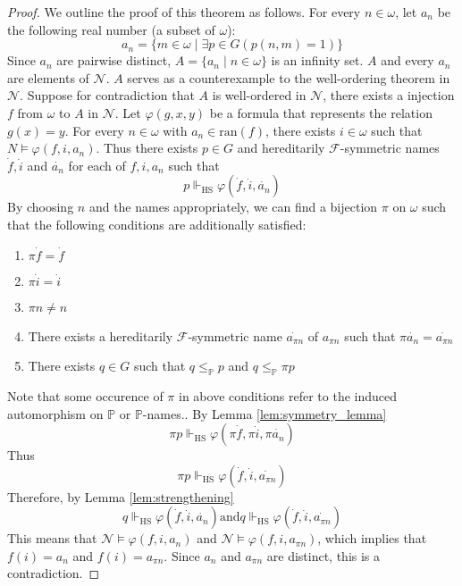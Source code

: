 \documentclass{report}
\newcommand{\Pbb}{\mathbb{P}}
\newcommand{\Fcal}{\mathcal{F}}
\newcommand{\Ncal}{\mathcal{N}}
\begin{document}
\begin{proof}
We outline the proof of this theorem as follows. 
For every $n \in \omega$, let $a_n$ be the following real number (a subset of $\omega$):
$$a_n = \{ m \in \omega \mid \exists p \in G (p(n, m) = 1) \}$$
Since $a_n$ are pairwise distinct, $A = \{ a_n \mid n \in \omega \}$ is an infinity set.
$A$ and every $a_n$ are elements of $\Ncal$.
$A$ serves as a counterexample to the well-ordering theorem in $\Ncal$.
Suppose for contradiction that $A$ is well-ordered in $\Ncal$, there exists a injection $f$ from $\omega$ to $A$ in $\Ncal$.
Let $\varphi(g,x,y)$ be a formula that represents the relation $g(x) = y$. 
For every $n \in \omega$ with $a_n \in \mathrm{ran}(f)$, there exists $i \in \omega$ such that $N \vDash \varphi(f, i, a_n)$.
Thus there exists $p \in G$ and hereditarily $\Fcal$-symmetric names $\dot{f}, \dot{i}$ and $\dot{a_n}$ for each of $f, i, a_n$ such that 
$$p \Vdash_{\mathrm{HS}} \varphi(\dot{f}, \dot{i}, \dot{a_n})$$
By choosing $n$ and the names appropriately, we can find a bijection $\pi$ on $\omega$ such that the following conditions are additionally satisfied:
\begin{enumerate}
  \item $\pi \dot{f} = \dot{f}$
  \item $\pi \dot{i} = \dot{i}$
  \item $\pi n \ne n$
  \item There exists a hereditarily $\Fcal$-symmetric name $\dot{a_{\pi n}}$ of $a_{\pi n}$ such that $\pi \dot{a_n} = \dot{a_{\pi n}}$
  \item There exists $q \in G$ such that $q \leq_{\Pbb} p$ and $q \leq_{\Pbb} \pi p$
\end{enumerate}
Note that some occurence of $\pi$ in above conditions refer to the induced automorphism on $\Pbb$ or $\Pbb$-names..
By Lemma \ref{lem:symmetry_lemma}
$$\pi p \Vdash_{\mathrm{HS}} \varphi(\pi \dot{f}, \pi \dot{i}, \pi \dot{a_n})$$
Thus 
$$\pi p \Vdash_{\mathrm{HS}} \varphi(\dot{f}, \dot{i}, \dot{a_{\pi n}})$$
Therefore, by Lemma \ref{lem:strengthening}
$$q \Vdash_{\mathrm{HS}} \varphi(\dot{f}, \dot{i}, \dot{a_n}) \mathrm{ and } q \Vdash_{\mathrm{HS}} \varphi(\dot{f}, \dot{i}, \dot{a_{\pi n}})$$
This means that $\Ncal \vDash \varphi(f, i, a_n)$ and $\Ncal \vDash \varphi(f, i, a_{\pi n})$, which implies that $f(i) = a_n$ and $f(i) = a_{\pi n}$.
Since $a_n$ and $a_{\pi n}$ are distinct, this is a contradiction. 
\end{proof}
 
\end{document}
